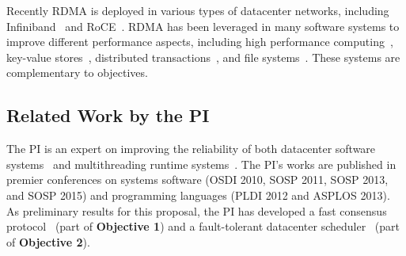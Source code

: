  Recently RDMA is deployed in various types of 
datacenter networks, including Infiniband~\cite{infiniband} and 
RoCE~\cite{roce}. RDMA has been leveraged in many 
software systems to improve different performance aspects, including high 
performance computing~\cite{openmpi}, key-value 
stores~\cite{pilaf:usenix14,herd:sigcomm14,farm:nsdi14,memcached:rdma}, 
distributed transactions~\cite{drtm:sosp15,farm:sosp15}, and file 
systems~\cite{gibson:nfs}. These systems are complementary to \xxx objectives.

\vspace{-.15in}\subsection{Related Work by the PI} 
\label{sec:my-work}\vspace{-.075in}
% 

The PI is an expert on improving the reliability of both datacenter software 
systems~\cite{crane:sosp15, tripod:apsys16} and multithreading runtime 
systems~\cite{smt:cacm, cui:tern:osdi10, peregrine:sosp11, parrot:sosp13}. The 
PI's works are published in premier conferences on systems software (OSDI 2010, 
SOSP 2011, SOSP 2013, and SOSP 2015) and programming languages (PLDI 2012 and 
ASPLOS 2013). As preliminary results for this \xxx proposal, the PI has 
developed a fast consensus protocol~\cite{crane:sosp15} (part of 
\textbf{Objective 1}) and a fault-tolerant datacenter 
scheduler~\cite{tripod:apsys16} (part of \textbf{Objective 2}).




